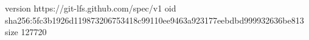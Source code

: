 version https://git-lfs.github.com/spec/v1
oid sha256:5fc3b1926d119873206753418c99110ee9463a923177eebdbd999932636be813
size 127720
